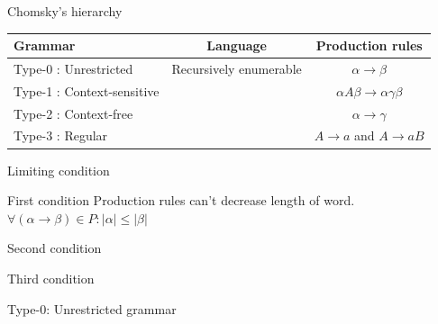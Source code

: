 \documentclass{beamer}
\begin{document}
\begin{frame}{Chomsky's hierarchy}

\begin{block}

\end{block}

\begin{table}\small
\begin{tabular}{l|c|c}
Grammar & Language & Production rules \\
\hline
Type-0 : Unrestricted & Recursively enumerable &  $\alpha \rightarrow \beta$ \\ %
Type-1 : Context-sensitive & & $\alpha A\beta \rightarrow \alpha \gamma \beta$ \\ 
Type-2 : Context-free  & & $\alpha \rightarrow \gamma$ \\ 
Type-3 : Regular & & $A\rightarrow a$ and $A\rightarrow aB$ 
\end{tabular}
\end{table}


\end{frame}

\begin{frame}{Limiting condition}

\begin{block}{First condition}
Production rules can't decrease length of word. $\forall (\alpha \rightarrow \beta)\in P : |\alpha| \leq |\beta|$
\end{block}

\begin{block}{Second condition}

\end{block}

\begin{block}{Third condition}

\end{block}

\end{frame}

\begin{frame}{Type-0: Unrestricted grammar}
\end{frame}
\end{document}
